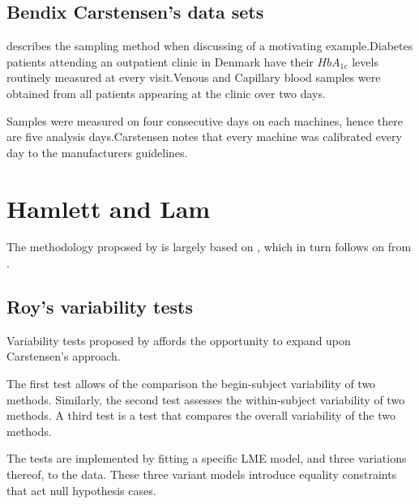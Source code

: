 \documentclass[12pt, a4paper]{report}
\theoremstyle{plain}
\theoremstyle{definition}
\theoremstyle{remark}
\begin{document}


\subsection{Bendix Carstensen's data sets}
\citet{bxc2008}describes the sampling method when discussing of a motivating example.Diabetes patients attending an outpatient clinic in Denmark have their $HbA_{1c}$ levels routinely measured at every visit.Venous and Capillary blood samples were obtained from all patients appearing at the clinic over two days.

Samples were measured on four consecutive days on each machines, hence there are five analysis days.Carstensen notes that every machine was calibrated every day to  the manufacturers guidelines.




\section{Hamlett and Lam}
The methodology proposed by \citet{Roy2009} is largely based on \citet{hamlett}, which in turn follows on from \citet{lam}.





\subsection{Roy's variability tests}
Variability tests proposed by \citet{Roy2009} affords the opportunity to expand upon Carstensen's approach.

The first test allows of the comparison the begin-subject variability of two methods. Similarly, the second test
assesses the within-subject variability of two methods. A third test is a test that compares the overall variability of the two methods.

The tests are implemented by fitting a specific LME model, and three variations thereof, to the data. These three variant models introduce equality constraints that act null hypothesis cases.
\end{document}
